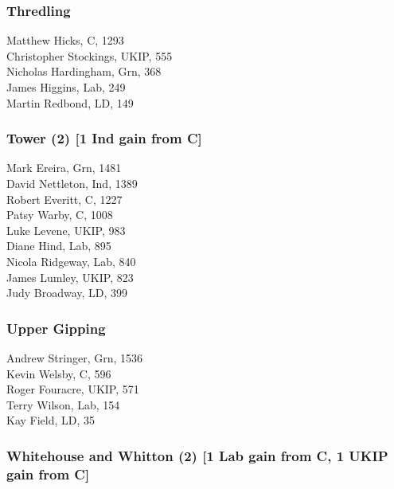 \documentclass[a4paper,openany,10pt]{book}
\begin{document}
\subsubsection*{Thredling}



Matthew Hicks, C, 1293\\
{Christopher Stockings}, UKIP, 555\\
{Nicholas Hardingham}, Grn, 368\\
James Higgins, Lab, 249\\
Martin Redbond, LD, 149\\


\subsubsection*{Tower (2) \hspace*{\fill}\nolinebreak[1]%
\enspace\hspace*{\fill}
[1 Ind gain from C]}



Mark Ereira, Grn, 1481\\
David Nettleton, Ind, 1389\\
Robert Everitt, C, 1227\\
Patsy Warby, C, 1008\\
Luke Levene, UKIP, 983\\
Diane Hind, Lab, 895\\
Nicola Ridgeway, Lab, 840\\
James Lumley, UKIP, 823\\
Judy Broadway, LD, 399\\


\subsubsection*{Upper Gipping}



Andrew Stringer, Grn, 1536\\
Kevin Welsby, C, 596\\
Roger Fouracre, UKIP, 571\\
Terry Wilson, Lab, 154\\
Kay Field, LD, 35\\


\subsubsection*{Whitehouse and Whitton (2) \hspace*{\fill}\nolinebreak[1]%
\enspace\hspace*{\fill}
[1 Lab gain from C, 1 UKIP gain from C]}
\end{document}
